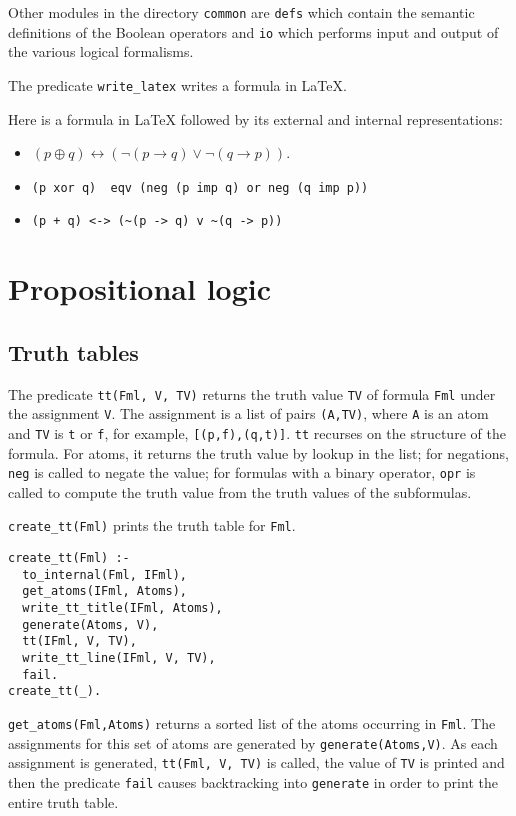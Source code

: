 \documentclass[11pt]{article}
\newcommand*{\p}[1]{\textup{\texttt{#1}}}
\begin{document}
Other modules in the directory \p{common} are \p{defs} which contain the
semantic definitions of the Boolean operators and \p{io} which performs
input and output of the various logical formalisms. 

The predicate \p{write\_latex} writes a formula in \LaTeX{}.

Here is a formula in \LaTeX{} followed by its external and internal representations:
\begin{itemize}
\item $(p \oplus q)  \leftrightarrow (\neg (p \rightarrow q) \vee \neg (q\rightarrow p) )$.
\item \verb+(p xor q)  eqv (neg (p imp q) or neg (q imp p))+
\item \verb=(p + q) <-> (~(p -> q) v ~(q -> p))=
\end{itemize}

\section{Propositional logic}

\subsection{Truth tables}\label{s.tt}

The predicate \p{tt(Fml, V, TV)} returns the truth value \p{TV} of
formula \p{Fml} under the assignment \p{V}. The assignment is a list of
pairs \p{(A,TV)}, where \p{A} is an atom and \p{TV} is \p{t} or \p{f},
for example, \p{[(p,f),(q,t)]}. \p{tt} recurses on the structure of the
formula. For atoms, it returns the truth value by lookup in the list;
for negations, \p{neg} is called to negate the value; for formulas with
a binary operator, \p{opr} is called to compute the truth value from the
truth values of the subformulas.

\p{create\_tt(Fml)} prints the truth table for \p{Fml}.
\begin{verbatim}
create_tt(Fml) :-
  to_internal(Fml, IFml),
  get_atoms(IFml, Atoms),
  write_tt_title(IFml, Atoms),
  generate(Atoms, V),
  tt(IFml, V, TV),
  write_tt_line(IFml, V, TV),
  fail.
create_tt(_).
\end{verbatim}

\p{get\_atoms(Fml,Atoms)} returns a sorted list of the atoms occurring
in \p{Fml}. The assignments for this set of atoms are generated by
\p{generate(Atoms,V)}. As each assignment is generated, \p{tt(Fml, V,
TV)} is called, the value of \p{TV} is printed and then the predicate
\p{fail} causes backtracking into \p{generate} in order to print the
entire truth table.
\end{document}
